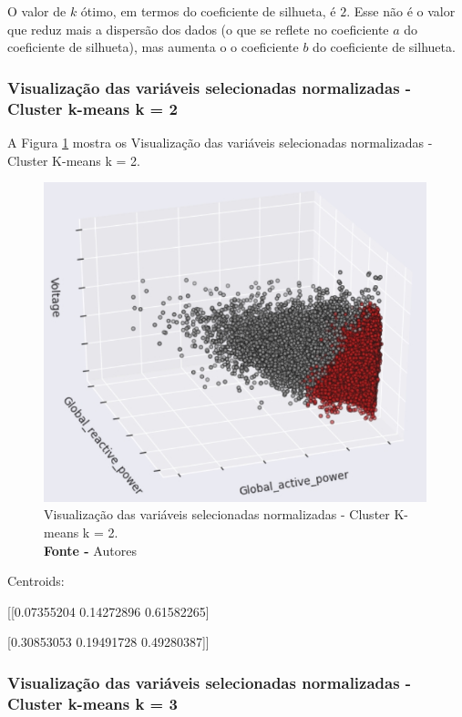 O valor de $k$ ótimo, em termos do coeficiente de silhueta, é  $2$. Esse não é o valor que reduz mais a dispersão dos dados (o que se reflete no coeficiente $a$ do coeficiente de silhueta), mas aumenta o o coeficiente $b$ do coeficiente de silhueta.

\subsubsection{Visualização das variáveis selecionadas normalizadas - Cluster k-means k = 2}

A Figura \ref{fig: Visualização das variáveis selecionadas normalizadas - Cluster K-means k = 2} mostra os Visualização das variáveis selecionadas normalizadas - Cluster K-means k = 2.
\begin{figure}[H]
    \centering
    \includegraphics[width=0.99\textwidth]{Figuras/4. Resultados e Discussões/Exer4/Visualização das variáveis selecionadas normalizadas - Cluster K-means k = 2.jpg}
    \caption{Visualização das variáveis selecionadas normalizadas - Cluster K-means k = 2.\\ \textbf{Fonte -} Autores}
    \label{fig: Visualização das variáveis selecionadas normalizadas - Cluster K-means k = 2}
\end{figure}

Centroids:

[[0.07355204 0.14272896 0.61582265]

 [0.30853053 0.19491728 0.49280387]]


\subsubsection{Visualização das variáveis selecionadas normalizadas - Cluster k-means k = 3}

